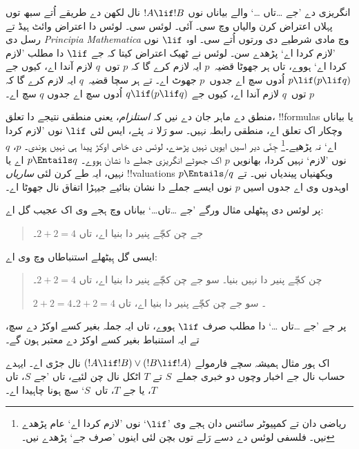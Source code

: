 \documentclass[../../../include/open-logic-section]{subfiles}
\begin{document}


انگریزی دے ’جے \dots تاں \dots‘ والے بیاناں نوں $!A \lif !B$ نال لکھن دے
طریقے اُتے سبھ توں پہلاں اعتراض کرن والیاں وچ سی۔ آئی۔ لوئس سی۔
لوئس دا اعتراض وائٹ ہیڈ تے رسل دی \emph{Principia Mathematica} وچ مادی
شرطیے دی ورتوں اُتے سی۔ اوہ $\lif$ نوں ’لازم کردا اے‘ پڑھدے سن۔
لوئس نے ٹھیک اعتراض کیتا کہ جے $\lif$ دا مطلب ’لازم کردا اے‘ ہووے،
تاں ہر جھوٹا قضیہ~$p$ ایہ لازم کرے گا کہ $p$ توں~$q$ لازم آندا اے،
کیوں جے $p \lif (p \lif q)$ اُدوں سچ اے جدوں~$p$ جھوٹ اے۔ تے ہر سچا
قضیہ~$q$ ایہ لازم کرے گا کہ $p$ توں~$q$ لازم آندا اے، کیوں جے
$q \lif (p \lif q)$ اُدوں سچ اے جدوں $q$ سچ اے۔

منطق دے ماہر جان دے نیں کہ \emph{استلزام}، یعنی منطقی نتیجے دا تعلق،
!!{formula}s یا بیاناں وچکار اک تعلق اے، منطقی رابطہ نہیں۔ سو رَلا نہ
پئے، ایس لئی $\lif$ نوں ’لازم کردا اے‘ نہ پڑھیے۔\footnote{ریاضی دان تے
  کمپیوٹر سائنس دان ہجے وی ’$\lif$‘ نوں ’لازم کردا اے‘ عام پڑھدے نیں۔
  فلسفی لوئس دے دسے رَلے توں بچن لئی اینوں ’صرف جے‘ پڑھدے نیں۔}
جِنّی دیر اسیں ایویں نہیں پڑھدے، لوئس دی خاص اوکڑ پیدا ہی نہیں ہوندی۔
$p$، $q$ نوں ’لازم‘ نہیں کردا، بھانویں $p$ اک جھوٹے انگریزی جملے دا نشان
ہووے۔ $p \Entails q$ اے یا نہیں، ایہ طے کرن لئی \emph{ساریاں}
!!{valuation}s ویکھنیاں پیندیاں نیں۔ تے $p \Entails/ q$ اوہدوں وی اے
جدوں اسیں $p$ نوں ایسے جملے دا نشان بنائیے جیہڑا اتفاق نال جھوٹا اے۔

پر لوئس دی ہِیٹھلی مثال ورگے ’جے \dots تاں\dots‘ بیاناں وچ ہجے وی
اک عجیب گل اے:
\begin{quote}
جے چن کچّے پنیر دا بنیا اے، تاں $2+2=4$۔
\end{quote}
ایسی گل ہِیٹھلے استنباطاں وچ وی اے:
\begin{quote}
  چن کچّے پنیر دا نہیں بنیا۔ سو جے چن کچّے پنیر دا بنیا اے، تاں $2+2=4$۔

  $2+2 = 4$۔ سو جے چن کچّے پنیر دا بنیا اے، تاں $2+2=4$۔
\end{quote}
پر جے ’جے \dots تاں \dots‘ دا مطلب صرف $\lif$ ہووے، تاں ایہ جملہ
بغیر کسے اوکڑ دے سچ، تے ایہ استنباط بغیر کسے اوکڑ دے معتبر ہون گے۔

اک ہور مثال ہمیشہ سچے فارمولے $(!A \lif !B) \lor (!B \lif
!A)$ نال جڑی اے۔ ایہدے حساب نال جے اخبار وچوں دو خبری جملے~$S$ تے $T$
اٹکل نال چن لئیے، تاں ’جے $S$، تاں $T$، یا جے $T$، تاں~$S$‘ سچ
ہونا چاہیدا اے۔
\end{document}
